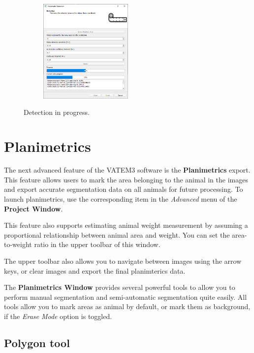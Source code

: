 \documentclass[10pt,a4paper,oneside]{report}             %
\begin{document}
\begin{figure}[H]
	\centering
	\begin{subfigure}{\textwidth}
		\centering 
		\includegraphics[width=0.5\textwidth]{./images/AutoDetect2.png}
	\end{subfigure}
	\caption[]
	{\small  Detection in progress.}
\end{figure} 

\section{Planimetrics}

The next advanced feature of the VATEM3 software is the \textbf{Planimetrics }export. This feature allows users to mark the area belonging to the animal in the images and export accurate segmentation data on all animals for future processing. To launch planimetrics, use the corresponding item in the \textit{Advanced} menu of the \textbf{Project Window}.

This feature also supports estimating animal weight measurement by assuming a proportional relationship between animal area and weight. You can set the area-to-weight ratio in the upper toolbar of this window. 

The upper toolbar also allows you to navigate between images using the arrow keys, or clear images and export the final planimterics data. 

The \textbf{Planimetrics Window} provides several powerful tools to allow you to perform manual segmentation and semi-automatic segmentation quite easily. All tools allow you to mark areas as animal by default, or mark them as background, if the \textit{Erase Mode} option is toggled.

\subsection{Polygon tool}
\end{document}
